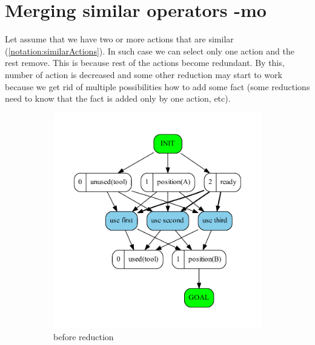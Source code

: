 
	\chapter{Merging similar operators -mo}
	
	Let assume that we have two or more actions that are similar (\ref{notation:similarActions}). In such case we can select only one action and the rest remove. This is because rest of the actions become redundant. By this, number of action is decreased and some other reduction may start to work because we get rid of multiple possibilities how to add some fact (some reductions need to know that the fact is added only by one action, etc).
	
	\begin{figure}
		\begin{subfigure}[b]{0.4\textwidth}
			\includegraphics[scale=0.4]{mergingSimilarOperators/figures/threeToOne_input}
			\caption{before reduction}
		\end{subfigure}	
		\begin{subfigure}[b]{0.4\textwidth}

\end{subfigure}
\end{figure}
